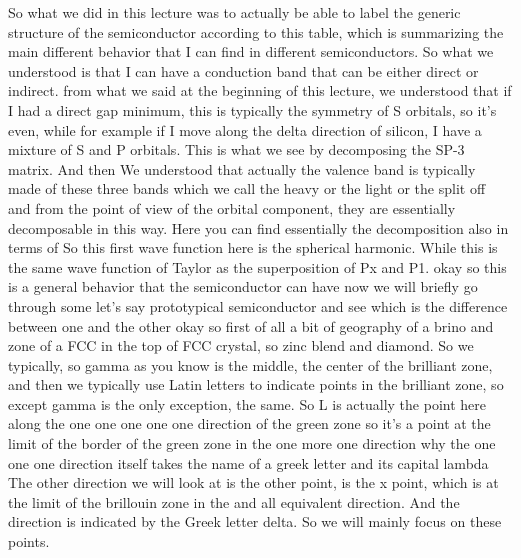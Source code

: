 So what we did in this lecture was to actually be able to label the generic structure of the semiconductor according to this table, which is summarizing the main different behavior that I can find in different semiconductors. So what we understood is that I can have a conduction band that can be either direct or indirect. from what we said at the beginning of this lecture, we understood that if I had a direct gap minimum, this is typically the symmetry of S orbitals, so it's even, while for example if I move along the delta direction of silicon, I have a mixture of S and P orbitals. This is what we see by decomposing the SP-3 matrix. And then We understood that actually the valence band is typically made of these three bands which we call the heavy or the light or the split off and from the point of view of the orbital component, they are essentially decomposable in this way. Here you can find essentially the decomposition also in terms of So this first wave function here is the spherical harmonic. While this is the same wave function of Taylor as the superposition of Px and P1. okay so this is a general behavior that the semiconductor can have now we will briefly go through some let's say prototypical semiconductor and see which is the difference between one and the other okay so first of all a bit of geography of a brino and zone of a FCC in the top of FCC crystal, so zinc blend and diamond. So we typically, so gamma as you know is the middle, the center of the brilliant zone, and then we typically use Latin letters to indicate points in the brilliant zone, so except gamma is the only exception, the same. So L is actually the point here along the one one one one one direction of the green zone so it's a point at the limit of the border of the green zone in the one more one direction why the one one one direction itself takes the name of a greek letter and its capital lambda The other direction we will look at is the other point, is the x point, which is at the limit of the brillouin zone in the and all equivalent direction. And the direction is indicated by the Greek letter delta. So we will mainly focus on these points.
